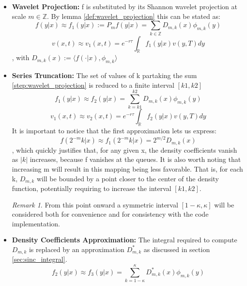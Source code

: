 \documentclass[12,twoside]{mammeTFM}
\theoremstyle{definition}
\theoremstyle{remark}
\newtheorem{remark}[thm]{Remark}
\newcommand{\Z}{\ensuremath{\mathbb{Z}}}
\newcommand{\R}{\ensuremath{\mathbb{R}}}
\begin{document}
\begin{itemize} \label{swift_steps}

\item \textbf{Wavelet Projection:} f is substituted by its Shannon wavelet projection at scale $m \in \Z$. By lemma \ref{def:wavelet_projection} this can be stated as:
\begin{equation} \label{step:wavelet_projection}
f(y|x) \approx f_1(y|x) := P_mf(y|x) = \sum_{k \in \Z} D_{m,k}(x) \phi_{m,k}(y)
\end{equation}
\begin{equation}
v(x,t) \approx v_1(x,t) = e^{-r \tau} \int_{\R} f_1(y|x)v(y, T)dy
\end{equation}
, with $D_{m,k}(x):=\langle f(\cdot | x), \phi_{m,k} \rangle$
\item \textbf{Series Truncation: } The set of values of k partaking the sum \ref{step:wavelet_projection} is reduced to a finite interval $[k1, k2]$
\begin{equation}
f_1(y|x) \approx f_2(y|x) = \sum_{k = k1}^{k2} D_{m,k}(x)\phi_{m,k}(y)
\end{equation}
\begin{equation} \label{step:series_truncation}
v_1(x,t) \approx v_2(x,t) = e^{-r \tau} \int_{\R} f_2(y|x)v(y, T)dy
\end{equation}
It is important to notice that the first approximation lets us express: 
\begin{equation}
f(2^{-m}k|x) \approx f_1(2^{-m}k|x) = 2^{m/2} D_{m,k}(x)
\end{equation}
, which quickly justifies that, for any given x, the density coefficients vanish as $|k|$ increases, because f vanishes at the queues. It is also worth noting that increasing m will result in this mapping being less favorable. That is, for each k, $D_{m,k}$ will be bounded by a point closer to the center of the density function, potentially requiring to increase the interval $[k1, k2]$.
\begin{remark}
From this point onward a symmetric interval $[1 - \kappa, \kappa]$ will be considered both for convenience and for consistency with the code implementation.
\end{remark}
\item \textbf{Density Coefficients Approximation: }
The integral required to compute $D_{m,k}$ is replaced by an approximation $D_{m,k}^{*}$ as discussed in section \ref{sec:sinc_integral}.
\begin{equation}
f_2 (y|x) \approx f_3(y | x) = \sum_{k = 1 - \kappa}^{\kappa} D_{m,k}^{*}(x)\phi_{m,k}(y)

\end{equation}
\end{itemize}
\end{document}
